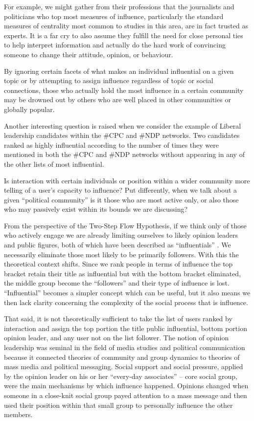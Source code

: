 \documentclass[a4paper,12pt]{article}
\begin{document}
For example, we might gather from their professions that the journalists and politicians who top most measures of influence, particularly the standard measures of centrality most common to studies in this area, are in fact trusted as experts. It is a far cry to also assume they fulfill the need for close personal ties to help interpret information and actually do the hard work of convincing someone to change their attitude, opinion, or behaviour. 

By ignoring certain facets of what makes an individual influential on a given topic or by attempting to assign influence regardless of topic or social connections, those who actually hold the most influence in a certain community may be drowned out by others who are well placed in other communities or globally popular.

Another interesting question is raised when we consider the example of  Liberal leadership candidates within the \#CPC and \#NDP networks. Two candidates ranked as highly influential according to the number of times they were mentioned in both the \#CPC and \#NDP networks without appearing in any of the other lists of most influential. 

Is interaction with certain individuals or position within a wider community more telling of a user's capacity to influence? Put differently, when we talk about a given ``political community'' is it those who are most active only, or also those who may passively exist within its bounds we are discussing? 

From the perspective of the Two-Step Flow Hypothesis, if we think only of those who actively engage we are already limiting ourselves to likely opinion leaders and public figures, both of which have been described as ``influentials'' \cite{katzlazarsfeld}. We necessarily eliminate those most likely to be primarily followers. With this the theoretical context shifts. Since we rank people in terms of influence the top bracket retain their title as influential but with the bottom bracket eliminated, the middle group become the ``followers'' and their type of influence is lost. ``Influential'' becomes a simpler concept which can be useful, but it also means we then lack clarity concerning the complexity of the social process that is influence.

That said, it is not theoretically sufficient to take the list of users ranked by interaction and assign the top portion the title public influential, bottom portion opinion leader, and any user not on the list follower. The notion of opinion leadership was seminal in the field of media studies and political communication because it connected theories of community and group dynamics to theories of mass media and political messaging. Social support and social pressure, applied by the opinion leader on his or her ``every-day associates'' -- core social group, were the main mechanisms by which influence happened. Opinions changed when someone in a close-knit social group payed attention to a mass message and then used their position within that small group to personally influence the other members. 
\end{document}
